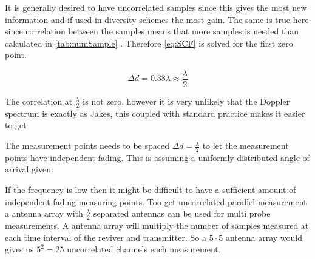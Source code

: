 It is generally desired to have uncorrelated samples since this gives the most new information and if used in diversity schemes the most gain. The same is true here since correlation between the samples means that more samples is needed than calculated in \autoref{tab:numSample} \citep[p.335]{Jakes_microwave}. Therefore \autoref{eq:SCF} is solved for the first zero point.


\begin{equation}
\Delta d = 0.38 \lambda \approx \frac{\lambda}{2}
\end{equation}

The correlation at $\frac{\lambda}{2}$ is not zero, however it is very unlikely that the Doppler spectrum is exactly as Jakes, this coupled with standard practice makes it easier to get

The measurement points needs to be spaced $\Delta d = \frac{\lambda}{2}$ to let the measurement points have independent fading. This is assuming a uniformly distributed angle of arrival given:



If the frequency is low then it might be difficult to have a sufficient amount of independent fading measuring points. \citep[p.11]{UWMeasurement} Too get uncorrelated  parallel measurement a antenna array with $\frac{\lambda}{2}$ separated antennas can be used for multi probe measurements. A antenna array will multiply the number of samples measured at each time interval of the reviver and transmitter. So a $5\cdot 5$ antenna array would gives us $5^2 = 25$ uncorrelated channels each measurement.




